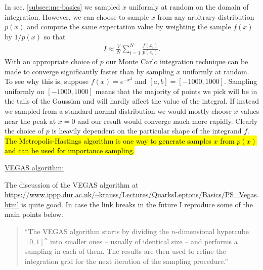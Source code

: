 \label{subsec:mc-importance-sampling}
In sec. \ref{subsec:mc-basics} we sampled $x$ uniformly at random on the domain of integration. However, we can choose to sample $x$ from any arbitrary distribution $p(x)$ and compute the same expectation value by weighting the sample $f(x)$ by $1 / p(x)$ so that
\begin{align}
    I \approx \frac{V}{N}\sum_{i=1}^{N} \frac{f(x_i)}{p(x_i)}.
\end{align}
With an appropriate choice of $p$ our Monte Carlo integration technique can be made to converge significantly faster than by sampling $x$ uniformly at random. 
To see why this is, suppose $f(x) = e^{-x^2}$ and $[a,b] = [-1000, 1000]$. 
Sampling uniformly on $[-1000, 1000]$ means that the majority of points we pick will be in the tails of the Gaussian and will hardly affect the value of the integral. 
If instead we sampled from a standard normal distribution we would mostly choose $x$ values near the peak at $x = 0$ and our result would converge much more rapidly.
Clearly the choice of $p$ is heavily dependent on the particular shape of the integrand $f$. 
\hl{The Metropolis-Hastings algorithm is one way to generate samples $x$ from $p(x)$ and can be used for importance sampling.}

\underline{VEGAS algorithm:}

The discussion of the VEGAS algorithm at \url{https://www.ippp.dur.ac.uk/~krauss/Lectures/QuarksLeptons/Basics/PS_Vegas.html} is quite good. In case the link breaks in the future I reproduce some of the main points below.
\begin{quotation}
    ``The VEGAS algorithm starts by dividing the $n$-dimensional hypercube $[0,1]^n$ into smaller ones -- usually of identical size -- and performs a sampling in each of them. 
    The results are then used to refine the integration grid for the next iteration of the sampling procedure.''
\end{quotation}
 
\label{subsec:stratified-sampling}

\label{subsec:multichannel-sampling}

